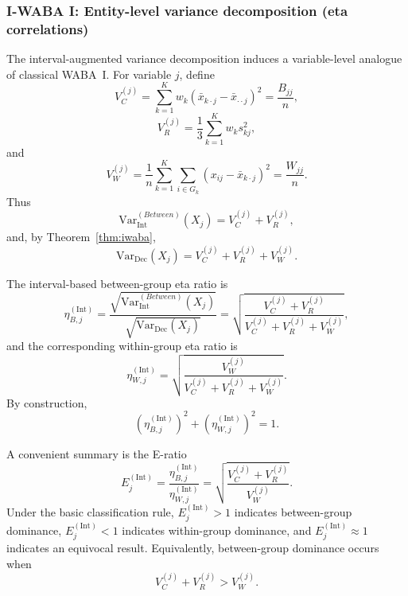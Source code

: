 \documentclass[preprint, times, 12pt, authoryear]{elsarticle}
\begin{document}
\subsubsection{I-WABA I: Entity-level variance decomposition (eta correlations)}\label{sec:iwaba_I}

The interval-augmented variance decomposition induces a variable-level analogue of classical WABA~I. For variable $j$, define
\[
V_C^{(j)}
=
\sum_{k=1}^K w_k\left(\bar{x}_{k\cdot j}-\bar{x}_{\cdot\cdot j}\right)^2
=
\frac{B_{jj}}{n},
\]
\[
V_R^{(j)}
=
\frac{1}{3}\sum_{k=1}^K w_k s_{kj}^2,
\]
and
\[
V_W^{(j)}
=
\frac{1}{n}\sum_{k=1}^K\sum_{i\in G_k}
\left(x_{ij}-\bar{x}_{k\cdot j}\right)^2
=
\frac{W_{jj}}{n}.
\]
Thus
\begin{equation}\label{eq:iwaba_between_var}
	\mathrm{Var}_{\mathrm{Int}}^{(Between)}(X_j)
	=
	V_C^{(j)}+V_R^{(j)},
\end{equation}
and, by Theorem~\ref{thm:iwaba},
\begin{equation}\label{eq:iwaba_total_var}
	\mathrm{Var}_{\mathrm{Dec}}(X_j)
	=
	V_C^{(j)}+V_R^{(j)}+V_W^{(j)}.
\end{equation}

The interval-based between-group eta ratio is
\begin{equation}\label{eq:eta_int}
	\eta_{B,j}^{(\mathrm{Int})}
	=
	\frac{\sqrt{\mathrm{Var}_{\mathrm{Int}}^{(Between)}(X_j)}}
	{\sqrt{\mathrm{Var}_{\mathrm{Dec}}(X_j)}}
	=
	\sqrt{\frac{V_C^{(j)}+V_R^{(j)}}{V_C^{(j)}+V_R^{(j)}+V_W^{(j)}}},
\end{equation}
and the corresponding within-group eta ratio is
\begin{equation}\label{eq:eta_int_within}
	\eta_{W,j}^{(\mathrm{Int})}
	=
	\sqrt{\frac{V_W^{(j)}}{V_C^{(j)}+V_R^{(j)}+V_W^{(j)}}}.
\end{equation}
By construction,
\[
\left(\eta_{B,j}^{(\mathrm{Int})}\right)^2
+
\left(\eta_{W,j}^{(\mathrm{Int})}\right)^2
=
1.
\]

A convenient summary is the E-ratio
\begin{equation}\label{eq:E_test_iwaba}
	E_j^{(\mathrm{Int})}
	=
	\frac{\eta_{B,j}^{(\mathrm{Int})}}{\eta_{W,j}^{(\mathrm{Int})}}
	=
	\sqrt{\frac{V_C^{(j)}+V_R^{(j)}}{V_W^{(j)}}}.
\end{equation}
Under the basic classification rule, $E_j^{(\mathrm{Int})}>1$ indicates between-group dominance, $E_j^{(\mathrm{Int})}<1$ indicates within-group dominance, and $E_j^{(\mathrm{Int})}\approx 1$ indicates an equivocal result. Equivalently, between-group dominance occurs when
\[
V_C^{(j)}+V_R^{(j)} > V_W^{(j)}.
\]
\end{document}
